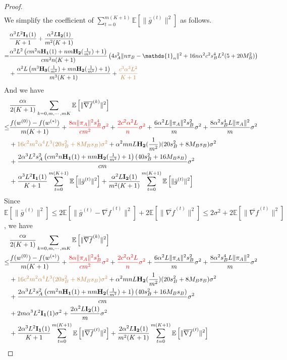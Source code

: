 \documentclass{article}
\newcommand{\EE}[1]{\mathbb{E}\left[#1\right]}
\newcommand{\norm}[1]{\| #1 \|}
\newcommand{\one}{\mathds{1}_n}
\begin{document}
\begin{proof}
\begin{align*}
  \end{align*}
  We simplify the coefficient of $\sum_{t=0}^{m(K+1)}\EE{\norm{\bar{g}^{(t)}}^2}$ as follows.
  \begin{align*}
    &\frac{\alpha^3L^2\mathbf{I_1}(1)}{K+1}+\frac{\alpha^2L\mathbf{I_2}(1)}{m^2(K+1)}
    \\=&\frac{\alpha^3 L^2\left(cm^2n\mathbf{H_1}(1)+nm\mathbf{H_2}(\frac{1}{m^2})+1\right)}{cm^2n(K+1)}\left(4s_A^2\norm{n\pi_B-\one}^2+16n\alpha^2c^2s_B^4L^2(5+20M_B^2)\right) \\&+\frac{\alpha^2L\left(m^3\mathbf{H_3}(\frac{1}{m^2})+mn\mathbf{H_2}(\frac{1}{m^2})+1\right)}{m^3(K+1)}+\textcolor{brown}{\frac{c^3\alpha^3L^2}{K+1}}
  \end{align*}
  And we have 
  \begin{align*}
    &\frac{c\alpha }{2(K+1)}\sum_{k=0,m,\cdots,mK}\EE{\norm{\overline{\nabla f}^{(k)}}^2}
  \\\leq& \frac{f(w^{(0)})-f(w^{(*)})}{m(K+1)}+\textcolor{red}{\frac{8\alpha \norm{\pi_A}^2s_B^4}{cm^2}\sigma^2}+\textcolor{red}{ \frac{2c^2\alpha^2L}{n}\sigma^2}+\frac{6\alpha^2L\norm{\pi_A}^2s_B^2}{m}\sigma^2+\frac{8\alpha^2s_B^4L\norm{\pi_A}^2}{m}\sigma^2\\&+\textcolor{brown}{16c^2m^2\alpha^4L^3(20s_B^2+8M_Bs_B)\sigma^2}+\alpha^2 mnL \mathbf{H_2}(\frac{1}{m^2})(20s_B^2+8M_Bs_B)\sigma^2\\ &+\frac{2\alpha^3 L^2s_A^2\left(cm^2n\mathbf{H_1}(1)+nm\mathbf{H_2}(\frac{1}{m^2})+1\right)(40s_B^2+16M_Bs_B)}{cm}\sigma^2\\&+\frac{\alpha^3L^2\mathbf{I_1}(1)}{K+1}\sum_{t=0}^{m(K+1)}\EE{\norm{\bar{g}^{(t)}}^2}+\frac{\alpha^2L\mathbf{I_2}(1)}{m^2(K+1)}\sum_{t=0}^{m(K+1)}\EE{\norm{\bar{g}^{(t)}}^2}
  \end{align*}
  Since $\EE{\norm{\bar{g}^{(t)}}^2}\leq 2\EE{\norm{\bar{g}^{(t)}-\overline{\nabla f}^{(t)}}^2}+2\EE{\norm{\overline{\nabla f}^{(t)}}^2}\leq 2\sigma^2+2\EE{\norm{\overline{\nabla f}^{(t)}}^2}$, we have
  \begin{align*}
    &\frac{c\alpha }{2(K+1)}\sum_{k=0,m,\cdots,mK}\EE{\norm{\overline{\nabla f}^{(k)}}^2}
  \\\leq& \frac{f(w^{(0)})-f(w^{(*)})}{m(K+1)}+\textcolor{red}{\frac{8\alpha \norm{\pi_A}^2s_B^4}{cm^2}\sigma^2}+\textcolor{red}{ \frac{2c^2\alpha^2L}{n}\sigma^2}+\frac{6\alpha^2L\norm{\pi_A}^2s_B^2}{m}\sigma^2+\frac{8\alpha^2s_B^4L\norm{\pi_A}^2}{m}\sigma^2\\&+\textcolor{brown}{16c^2m^2\alpha^4L^3(20s_B^2+8M_Bs_B)\sigma^2}+\alpha^2 mnL \mathbf{H_2}(\frac{1}{m^2})(20s_B^2+8M_Bs_B)\sigma^2\\ &+\frac{2\alpha^3 L^2s_A^2\left(cm^2n\mathbf{H_1}(1)+nm\mathbf{H_2}(\frac{1}{m^2})+1\right)(40s_B^2+16M_Bs_B)}{cm}\sigma^2\\&+2m\alpha^3L^2\mathbf{I_1}(1)\sigma^2+\frac{2\alpha^2L\mathbf{I_2}(1)}{m}\sigma^2\\&+\frac{2\alpha^3L^2\mathbf{I_1}(1)}{K+1}\sum_{t=0}^{m(K+1)}\EE{\norm{\overline{\nabla f}^{(t)}}^2}+\frac{2\alpha^2L\mathbf{I_2}(1)}{m^2(K+1)}\sum_{t=0}^{m(K+1)}\EE{\norm{\overline{\nabla f}^{(t)}}^2}

\end{align*}
\end{proof}
\end{document}
